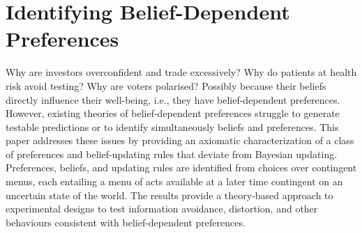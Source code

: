 \chapter{Identifying Belief-Dependent Preferences}\label{ch:bdp}

\begin{chapterabstract}
	Why are investors overconfident and trade excessively? Why do patients at health risk avoid testing? Why are voters polarised? Possibly because their beliefs directly influence their well-being, i.e., they have belief-dependent preferences. However, existing theories of belief-dependent preferences struggle to generate testable predictions or to identify simultaneously beliefs and preferences. This paper addresses these issues by providing an axiomatic characterization of a class of preferences and belief-updating rules that deviate from Bayesian updating. Preferences, beliefs, and updating rules are identified from choices over contingent menus, each entailing a menu of acts available at a later time contingent on an uncertain state of the world. The results provide a theory-based approach to experimental designs to test information avoidance, distortion, and other behaviours consistent with belief-dependent preferences.
\end{chapterabstract}



